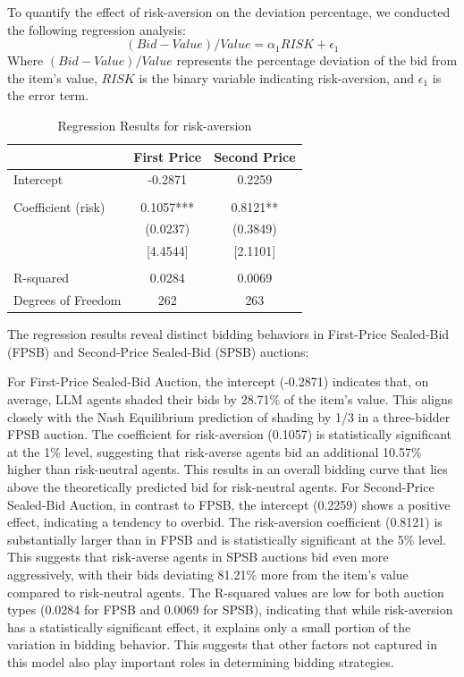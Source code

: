 \documentclass{article} %
\begin{document}
To quantify the effect of risk-aversion on the deviation percentage, we conducted the following regression analysis:
\begin{equation}
    (Bid-Value)/Value = \alpha_1 RISK + \epsilon_1
\end{equation}
Where $(Bid-Value)/Value$ represents the percentage deviation of the bid from the item's value, $RISK$ is the binary variable indicating risk-aversion, and $\epsilon_1$ is the error term.

\begin{table}[htbp]
\centering
\begin{tabular}{lcc}
\hline
 & First Price & Second Price \\
\hline
Intercept & -0.2871 & 0.2259 \\
 & & \\
Coefficient (risk) & 0.1057*** & 0.8121** \\
 & (0.0237) & (0.3849) \\
 & [4.4544] & [2.1101] \\
 & & \\
R-squared & 0.0284 & 0.0069 \\
Degrees of Freedom & 262 & 263 \\
\hline
\end{tabular}
\caption{Regression Results for risk-aversion}
\label{tab:regression_results_risk}
\end{table}

The regression results reveal distinct bidding behaviors in First-Price Sealed-Bid (FPSB) and Second-Price Sealed-Bid (SPSB) auctions:

For First-Price Sealed-Bid Auction, the intercept (-0.2871) indicates that, on average, LLM agents shaded their bids by 28.71\% of the item's value. 
This aligns closely with the Nash Equilibrium prediction of shading by 1/3 in a three-bidder FPSB auction. 
The coefficient for risk-aversion (0.1057) is statistically significant at the 1\% level, suggesting that risk-averse agents bid an additional 10.57\% higher than risk-neutral agents. 
This results in an overall bidding curve that lies above the theoretically predicted bid for risk-neutral agents.
For Second-Price Sealed-Bid Auction, in contrast to FPSB, the intercept (0.2259) shows a positive effect, indicating a tendency to overbid. 
The risk-aversion coefficient (0.8121) is substantially larger than in FPSB and is statistically significant at the 5\% level. 
This suggests that risk-averse agents in SPSB auctions bid even more aggressively, with their bids deviating 81.21\% more from the item's value compared to risk-neutral agents.
The R-squared values are low for both auction types (0.0284 for FPSB and 0.0069 for SPSB), indicating that while risk-aversion has a statistically significant effect, it explains only a small portion of the variation in bidding behavior. 
This suggests that other factors not captured in this model also play important roles in determining bidding strategies.
\end{document}
